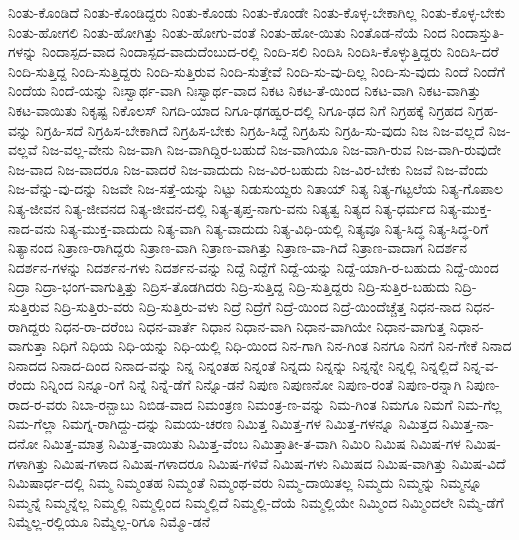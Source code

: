 {ನಿಂತು-ಕೊಂಡಿದೆ
ನಿಂತು-ಕೊಂಡಿದ್ದರು
ನಿಂತು-ಕೊಂಡು
ನಿಂತು-ಕೊಂಡೇ
ನಿಂತು-ಕೊಳ್ಳ-ಬೇಕಾಗಿಲ್ಲ
ನಿಂತು-ಕೊಳ್ಳ-ಬೇಕು
ನಿಂತು-ಹೋಗಲಿ
ನಿಂತು-ಹೋಗಿತ್ತು
ನಿಂತು-ಹೋಗು-ವಂತೆ
ನಿಂತು-ಹೋ-ಯಿತು
ನಿಂತೊಡ-ನೆಯೆ
ನಿಂದ
ನಿಂದಾಸ್ತುತಿ-ಗಳನ್ನು
ನಿಂದಾಸ್ಪದ-ವಾದ
ನಿಂದಾಸ್ಪದ-ವಾದುದೆಂಬುದ-ರಲ್ಲಿ
ನಿಂದಿ-ಸಲಿ
ನಿಂದಿಸಿ
ನಿಂದಿಸಿ-ಕೊಳ್ಳುತ್ತಿದ್ದರು
ನಿಂದಿಸಿ-ದರೆ
ನಿಂದಿ-ಸುತ್ತಿದ್ದ
ನಿಂದಿ-ಸುತ್ತಿದ್ದರು
ನಿಂದಿ-ಸುತ್ತಿರುವ
ನಿಂದಿ-ಸುತ್ತೇವೆ
ನಿಂದಿ-ಸು-ವು-ದಿಲ್ಲ
ನಿಂದಿ-ಸು-ವುದು
ನಿಂದೆ
ನಿಂದೆಗೆ
ನಿಂದೆಯ
ನಿಂದೆ-ಯನ್ನು
ನಿಃಸ್ವಾರ್ಥ-ವಾಗಿ
ನಿಃಸ್ವಾರ್ಥ-ವಾದ
ನಿಕಟ
ನಿಕಟ-ತೆ-ಯಿಂದ
ನಿಕಟ-ವಾಗಿ
ನಿಕಟ-ವಾಗಿತ್ತು
ನಿಕಟ-ವಾಯಿತು
ನಿಕೃಷ್ಟ
ನಿಕೊಲಸ್
ನಿಗದಿ-ಯಾದ
ನಿಗೂ-ಢಗಹ್ವರ-ದಲ್ಲಿ
ನಿಗೂ-ಢದ
ನಿಗೆ
ನಿಗ್ರಹಕ್ಕೆ
ನಿಗ್ರಹದ
ನಿಗ್ರಹ-ವನ್ನು
ನಿಗ್ರಹಿ-ಸದೆ
ನಿಗ್ರಹಿಸ-ಬೇಕಾಗಿದೆ
ನಿಗ್ರಹಿಸ-ಬೇಕು
ನಿಗ್ರಹಿ-ಸಿದ್ದೆ
ನಿಗ್ರಹಿಸು
ನಿಗ್ರಹಿ-ಸು-ವುದು
ನಿಜ
ನಿಜ-ವಲ್ಲದೆ
ನಿಜ-ವಲ್ಲವೆ
ನಿಜ-ವಲ್ಲ-ವೇನು
ನಿಜ-ವಾಗಿ
ನಿಜ-ವಾಗಿದ್ದಿರ-ಬಹುದೆ
ನಿಜ-ವಾಗಿಯೂ
ನಿಜ-ವಾಗಿ-ರುವ
ನಿಜ-ವಾಗಿ-ರುವುದೇ
ನಿಜ-ವಾದ
ನಿಜ-ವಾದರೂ
ನಿಜ-ವಾದರೆ
ನಿಜ-ವಾದುದು
ನಿಜ-ವಿರ-ಬಹುದು
ನಿಜ-ವಿರ-ಬೇಕು
ನಿಜವೆ
ನಿಜ-ವೆಂದು
ನಿಜ-ವೆನ್ನು-ವು-ದನ್ನು
ನಿಜವೇ
ನಿಜ-ಸತ್ತೆ-ಯನ್ನು
ನಿಟ್ಟು
ನಿಡುಸುಯ್ದರು
ನಿತಾಯ್
ನಿತ್ಯ
ನಿತ್ಯ-ಗಟ್ಟಲೆಯ
ನಿತ್ಯ-ಗೊಪಾಲ
ನಿತ್ಯ-ಜೀವನ
ನಿತ್ಯ-ಜೀವನದ
ನಿತ್ಯ-ಜೀವನ-ದಲ್ಲಿ
ನಿತ್ಯ-ತೃಪ್ತ-ನಾಗು-ವನು
ನಿತ್ಯತ್ವ
ನಿತ್ಯದ
ನಿತ್ಯ-ಧರ್ಮದ
ನಿತ್ಯ-ಮುಕ್ತ-ನಾದ-ವನು
ನಿತ್ಯ-ಮುಕ್ತ-ವಾದುದು
ನಿತ್ಯ-ವಾಗಿ
ನಿತ್ಯ-ವಾದುದು
ನಿತ್ಯ-ವಿಧಿ-ಯಲ್ಲಿ
ನಿತ್ಯವೂ
ನಿತ್ಯ-ಸಿದ್ಧ
ನಿತ್ಯ-ಸಿದ್ಧ-ರಿಗೆ
ನಿತ್ಯಾನಂದ
ನಿತ್ರಾಣ-ರಾಗಿದ್ದರು
ನಿತ್ರಾಣ-ವಾಗಿ
ನಿತ್ರಾಣ-ವಾಗಿತ್ತು
ನಿತ್ರಾಣ-ವಾ-ಗಿದೆ
ನಿತ್ರಾಣ-ವಾದಾಗ
ನಿದರ್ಶನ
ನಿದರ್ಶನ-ಗಳನ್ನು
ನಿದರ್ಶನ-ಗಳು
ನಿದರ್ಶನ-ವನ್ನು
ನಿದ್ದೆ
ನಿದ್ದೆಗೆ
ನಿದ್ದೆ-ಯನ್ನು
ನಿದ್ದೆ-ಯಾಗಿ-ರ-ಬಹುದು
ನಿದ್ದೆ-ಯಿಂದ
ನಿದ್ರಾ
ನಿದ್ರಾ-ಭಂಗ-ವಾಗುತ್ತಿತ್ತು
ನಿದ್ರಿಸ-ತೊಡಗಿದರು
ನಿದ್ರಿ-ಸುತ್ತಿದ್ದ
ನಿದ್ರಿ-ಸುತ್ತಿದ್ದರು
ನಿದ್ರಿ-ಸುತ್ತಿರ-ಬಹುದು
ನಿದ್ರಿ-ಸುತ್ತಿರುವ
ನಿದ್ರಿ-ಸುತ್ತಿರು-ವರು
ನಿದ್ರಿ-ಸುತ್ತಿರು-ವಳು
ನಿದ್ರೆ
ನಿದ್ರೆಗೆ
ನಿದ್ರೆ-ಯಿಂದ
ನಿದ್ರೆ-ಯಿಂದೆಚ್ಚೆತ್ತ
ನಿಧನ-ನಾದ
ನಿಧನ-ರಾಗಿದ್ದರು
ನಿಧನ-ರಾ-ದರೆಂಬ
ನಿಧನ-ವಾರ್ತೆ
ನಿಧಾನ
ನಿಧಾನ-ವಾಗಿ
ನಿಧಾನ-ವಾಗಿಯೇ
ನಿಧಾನ-ವಾಗುತ್ತ
ನಿಧಾನ-ವಾಗುತ್ತಾ
ನಿಧಿಗೆ
ನಿಧಿಯ
ನಿಧಿ-ಯನ್ನು
ನಿಧಿ-ಯಲ್ಲಿ
ನಿಧಿ-ಯಿಂದ
ನಿನ-ಗಾಗಿ
ನಿನ-ಗಿಂತ
ನಿನಗೂ
ನಿನಗೆ
ನಿನ-ಗೇಕೆ
ನಿನಾದ
ನಿನಾದದ
ನಿನಾದ-ದಿಂದ
ನಿನಾದ-ವನ್ನು
ನಿನ್ನ
ನಿನ್ನಂತಹ
ನಿನ್ನಂತೆ
ನಿನ್ನದು
ನಿನ್ನನ್ನು
ನಿನ್ನನ್ನೇ
ನಿನ್ನಲ್ಲಿ
ನಿನ್ನಲ್ಲಿದೆ
ನಿನ್ನ-ವ-ರೆಂದು
ನಿನ್ನಿಂದ
ನಿನ್ನೂ-ರಿಗೆ
ನಿನ್ನೆ
ನಿನ್ನೆ-ಡೆಗೆ
ನಿನ್ನೊ-ಡನೆ
ನಿಪುಣ
ನಿಪುಣನೋ
ನಿಪುಣ-ರಂತೆ
ನಿಪುಣ-ರನ್ನಾಗಿ
ನಿಪುಣ-ರಾದ-ರ-ವರು
ನಿಬಾ-ರನ್ಬಾಬು
ನಿಬಿಡ-ವಾದ
ನಿಮಂತ್ರಣ
ನಿಮಂತ್ರ-ಣ-ವನ್ನು
ನಿಮ-ಗಿಂತ
ನಿಮಗೂ
ನಿಮಗೆ
ನಿಮ-ಗೆಲ್ಲ
ನಿಮ-ಗೆಲ್ಲಾ
ನಿಮಗ್ನ-ರಾಗಿದ್ದು-ದನ್ನು
ನಿಮಯ-ಚರಣ
ನಿಮಿತ್ತ
ನಿಮಿತ್ತ-ಗಳ
ನಿಮಿತ್ತ-ಗಳನ್ನೂ
ನಿಮಿತ್ತದ
ನಿಮಿತ್ತ-ನಾ-ದನೋ
ನಿಮಿತ್ತ-ಮಾತ್ರ
ನಿಮಿತ್ತ-ವಾಯಿತು
ನಿಮಿತ್ತ-ವೆಂಬ
ನಿಮಿತ್ತಾತೀ-ತ-ವಾಗಿ
ನಿಮಿರಿ
ನಿಮಿಷ
ನಿಮಿಷ-ಗಳ
ನಿಮಿಷ-ಗಳಾಗಿತ್ತು
ನಿಮಿಷ-ಗಳಾದ
ನಿಮಿಷ-ಗಳಾದರೂ
ನಿಮಿಷ-ಗಳಿವೆ
ನಿಮಿಷ-ಗಳು
ನಿಮಿಷದ
ನಿಮಿಷ-ವಾಗಿತ್ತು
ನಿಮಿಷ-ವಿದೆ
ನಿಮಿಷಾರ್ಧ-ದಲ್ಲಿ
ನಿಮ್ಮ
ನಿಮ್ಮಂತಹ
ನಿಮ್ಮಂತೆ
ನಿಮ್ಮಂಥ-ವರು
ನಿಮ್ಮ-ದಾಯಿತಲ್ಲ
ನಿಮ್ಮದು
ನಿಮ್ಮನ್ನು
ನಿಮ್ಮನ್ನೂ
ನಿಮ್ಮನ್ನೆ
ನಿಮ್ಮನ್ನೆಲ್ಲ
ನಿಮ್ಮಲ್ಲಿ
ನಿಮ್ಮಲ್ಲಿಂದ
ನಿಮ್ಮಲ್ಲಿದೆ
ನಿಮ್ಮಲ್ಲಿ-ದೆಯೆ
ನಿಮ್ಮಲ್ಲಿಯೇ
ನಿಮ್ಮಿಂದ
ನಿಮ್ಮಿಂದಲೇ
ನಿಮ್ಮೆ-ಡೆಗೆ
ನಿಮ್ಮೆಲ್ಲ-ರಲ್ಲಿಯೂ
ನಿಮ್ಮೆಲ್ಲ-ರಿಗೂ
ನಿಮ್ಮೊ-ಡನೆ
}
